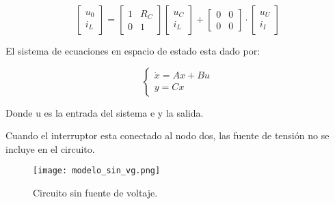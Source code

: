 \begin{equation}
    \begin{bmatrix}
        u_0\\
        i_L
    \end{bmatrix}
    =
    \begin{bmatrix}
        1 & R_C\\
        0 & 1
    \end{bmatrix}
    \begin{bmatrix}
        u_C\\
        i_L
    \end{bmatrix}
    +
    \begin{bmatrix}
        0 & 0\\
        0 & 0
    \end{bmatrix}
    \cdot
    \begin{bmatrix}
        u_U\\
        i_I
    \end{bmatrix}
\end{equation}

El sistema de ecuaciones en espacio de estado esta dado por:

\vspace{-0.5cm}
\begin{equation}
    \begin{cases}
    \dot{x} = Ax + Bu \\
    y = Cx
    \end{cases}
\end{equation}

Donde u es la entrada del sistema e y la salida.

Cuando el interruptor esta conectado al nodo dos, las fuente de tensión 
no se incluye en el circuito.

\begin{figure}[H]
    \centering
    \texttt{[image: modelo\_sin\_vg.png]}
    \vspace{-0.25cm}
    \caption{Circuito sin fuente de voltaje.}
    \label{fig:modelado_sin_vg}
\end{figure}

